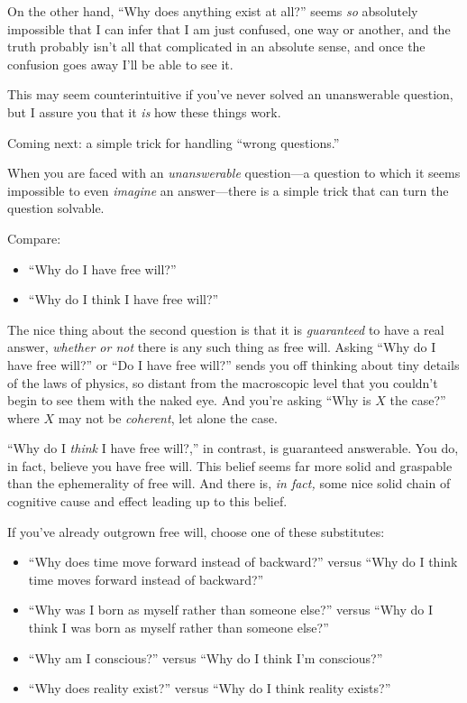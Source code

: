{
 On the other hand, ``Why does anything exist at
all?'' seems \textit{so} absolutely impossible that I
can infer that I am just confused, one way or another, and the truth
probably isn't all that complicated in an absolute
sense, and once the confusion goes away I'll be able to
see it.}

{
 This may seem counterintuitive if you've never
solved an unanswerable question, but I assure you that it \textit{is}
how these things work.}

{
 Coming next: a simple trick for handling ``wrong
questions.''}

\myendsectiontext


{
 When you are faced with an \textit{unanswerable} question---a
question to which it seems impossible to even \textit{imagine} an
answer---there is a simple trick that can turn the question solvable. }

{
 Compare:}

\begin{itemize}
\item  ``Why do I have free will?''
\item  ``Why do I think I have free
  will?''
\end{itemize}

{
 The nice thing about the second question is that it is
\textit{guaranteed} to have a real answer, \textit{whether or not}
there is any such thing as free will. Asking ``Why do
I have free will?'' or ``Do I have
free will?'' sends you off thinking about tiny
details of the laws of physics, so distant from the macroscopic level
that you couldn't begin to see them with the naked eye.
And you're asking ``Why is $X$ the
case?'' where $X$ may not be \textit{coherent}, let
alone the case.}

{
 ``Why do I \textit{think} I have free
will?,'' in contrast, is guaranteed answerable. You
do, in fact, believe you have free will. This belief seems far more
solid and graspable than the ephemerality of free will. And there is,
\textit{in fact,} some nice solid chain of cognitive cause and effect
leading up to this belief.}

{
 If you've already outgrown free will, choose one
of these substitutes:}

\begin{itemize}
\item {
 ``Why does time move forward instead of
backward?'' versus ``Why do I think
time moves forward instead of backward?''}

\item {
 ``Why was I born as myself rather than someone
else?'' versus ``Why do I think I
was born as myself rather than someone else?''}

\item {
 ``Why am I conscious?'' versus
``Why do I think I'm
conscious?''}

\item {
 ``Why does reality exist?''
versus ``Why do I think reality
exists?''}
\end{itemize}

